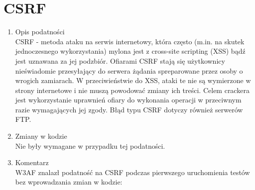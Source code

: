 \noindent
\begin{minipage}{\linewidth}
\label{erd}
\end{minipage}


\section{CSRF}
\begin{enumerate}
\item Opis podatności\\
CSRF - metoda ataku na serwis internetowy, która często (m.in. na skutek jednoczesnego wykorzystania) mylona jest z cross-site scripting (XSS) bądź jest uznawana za jej podzbiór. Ofiarami CSRF stają się użytkownicy nieświadomie przesyłający do serwera żądania spreparowane przez osoby o wrogich zamiarach. W przeciwieństwie do XSS, ataki te nie są wymierzone w strony internetowe i nie muszą powodować zmiany ich treści. Celem crackera jest wykorzystanie uprawnień ofiary do wykonania operacji w przeciwnym razie wymagających jej zgody. Błąd typu CSRF dotyczy również serwerów FTP. 
\item Zmiany w kodzie\\
Nie były wymagane w przypadku tej podatności.
\item Komentarz\\
W3AF znalazł podatność na CSRF podczas pierwszego uruchomienia testów bez wprowadzania zmian w kodzie:
\noindent
\begin{minipage}{\linewidth}
\label{erd}
\end{minipage}
\end{enumerate}

